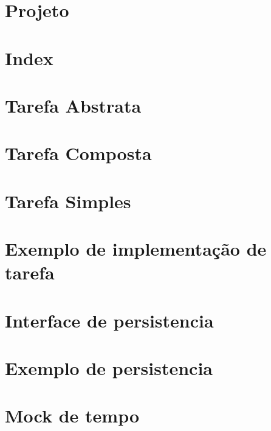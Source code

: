\documentclass[12pt]{tcc}
\begin{document}
\section{Projeto}


\section{Index}


\section{Tarefa Abstrata}


\section{Tarefa Composta}


\section{Tarefa Simples}


\section{Exemplo de implementação de tarefa}


\section{Interface de persistencia}


\section{Exemplo de persistencia}


\section{Mock de tempo}

\end{document}
